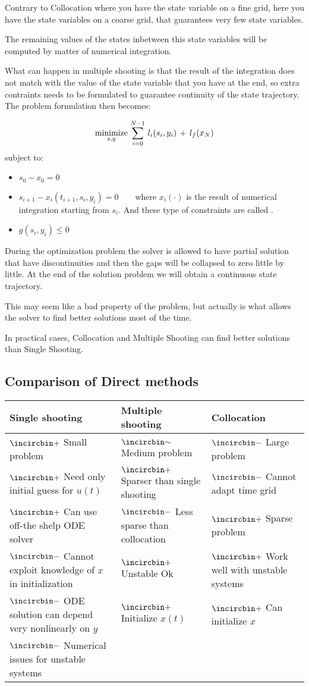 Contrary to Collocation where you have the state variable on a fine grid, here you have the state variables on a coarse grid, that guarantees very few state variables.

The remaining values of the states inbetween this state variables will be computed by matter of numerical integration.

What can happen in multiple shooting is that the result of the integration does not match with the value of the state variable that you have at the end, so extra contraints needs to be formulated to guarantee continuity of the state trajectory. The problem formulation then becomes:

\[\operatorname*{minimize}_{s, y} \,\sum_{i=0}^{N-1}\,l_i(s_i, y_i)\,+\,l_f(x_N)\]
subject to:
\begin{itemize}
\item $s_0 - x_0 = 0$
\item $s_{i+1} - x_i(t_{i+1}, s_i, y_i) = 0\qquad$where $x_i(\cdot)$ is the result of numerical integration starting from $s_i$. And these type of constraints are called .
\item $g(s_i, y_i) \le 0$
\end{itemize}


During the optimization problem the solver is allowed to have partial solution that have discontinuities and then the gaps will be collapsed to zero little by little. At the end of the solution problem we will obtain a continuous state trajectory.

This may seem like a bad property of the problem, but actually is what allows the solver to find better solutions most of the time.

In practical cases, Collocation and Multiple Shooting can find better solutions than Single Shooting.

 
\subsection{Comparison of Direct methods}
\begin{table}[!h]
\centering
\begin{tabularx}{\textwidth}{|X|X|X|}
\textbf{Single shooting} & \textbf{Multiple shooting} & \textbf{Collocation}\\
\hline
$\ooplus$ Small problem & $\oocirca$ Medium problem & $\oominus$ Large problem\\
$\ooplus$ Need only initial guess for $u(t)$ &$\ooplus$ Sparser than single shooting& $\oominus$ Cannot adapt time grid\\
$\ooplus$ Can use off-the shelp ODE solver &$\oominus$ Less sparse than collocation & $\ooplus$ Sparse problem\\
$\oominus$ Cannot exploit knowledge of $x$ in initialization & $\ooplus$ Unstable Ok &$\ooplus$ Work well with unstable systems\\
$\oominus$ ODE solution can depend very nonlinearly on $y$ & $\ooplus$ Initialize $x(t)$ & $\ooplus$ Can initialize $x$\\
$\oominus$ Numerical issues for unstable systems&&
\end{tabularx}
\end{table}
